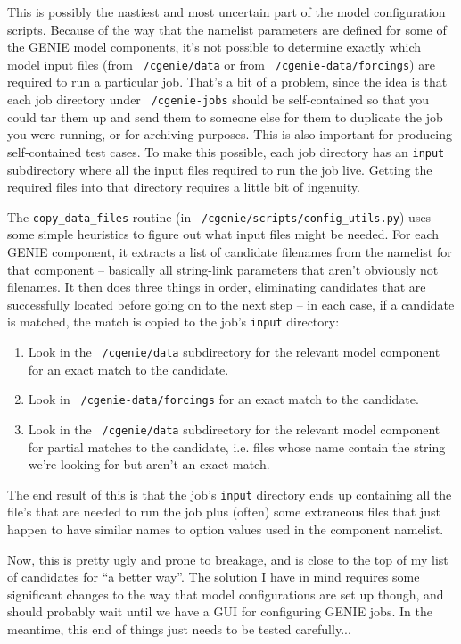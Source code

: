 \documentclass[a4paper,10pt,article]{memoir}
\begin{document}
This is possibly the nastiest and most uncertain part of the model
configuration scripts.  Because of the way that the namelist
parameters are defined for some of the GENIE model components, it's
not possible to determine exactly which model input files (from
\texttt{~/cgenie/data} or from \texttt{~/cgenie-data/forcings}) are
required to run a particular job.  That's a bit of a problem, since
the idea is that each job directory under \texttt{~/cgenie-jobs}
should be self-contained so that you could tar them up and send them
to someone else for them to duplicate the job you were running, or for
archiving purposes.  This is also important for producing
self-contained test cases.  To make this possible, each job directory
has an \texttt{input} subdirectory where all the input files required
to run the job live.  Getting the required files into that directory
requires a little bit of ingenuity.

The \texttt{copy\_data\_files} routine (in
\texttt{~/cgenie/scripts/config\_utils.py}) uses some simple
heuristics to figure out what input files might be needed.  For each
GENIE component, it extracts a list of candidate filenames from the
namelist for that component -- basically all string-link parameters
that aren't obviously not filenames.  It then does three things in
order, eliminating candidates that are successfully located before
going on to the next step -- in each case, if a candidate is matched,
the match is copied to the job's \texttt{input} directory:
\begin{enumerate}
  \item{Look in the \texttt{~/cgenie/data} subdirectory for the
    relevant model component for an exact match to the candidate.}
  \item{Look in \texttt{~/cgenie-data/forcings} for an exact match to
    the candidate.}
  \item{Look in the \texttt{~/cgenie/data} subdirectory for the
    relevant model component for partial matches to the candidate,
    i.e. files whose name contain the string we're looking for but
    aren't an exact match.}
\end{enumerate}

The end result of this is that the job's \texttt{input} directory ends
up containing all the file's that are needed to run the job plus
(often) some extraneous files that just happen to have similar names
to option values used in the component namelist.

Now, this is pretty ugly and prone to breakage, and is close to the
top of my list of candidates for ``a better way''.  The solution I
have in mind requires some significant changes to the way that model
configurations are set up though, and should probably wait until we
have a GUI for configuring GENIE jobs.  In the meantime, this end of
things just needs to be tested carefully...
\end{document}
